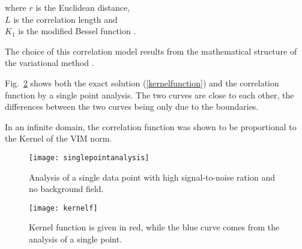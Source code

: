 where $r$ is the Euclidean distance,\\ 
\hphantom{where} $L$ is the correlation length and \\
\hphantom{where} $K_{1}$ is the modified Bessel function \citep[][page 359]{ABRAMOWITZ64}.

%
%
%
%
%
%
%

The choice of this correlation model results from the mathematical structure of the variational method \citep{BRASSEUR96}.

Fig.~\ref{kernel1} shows both the exact solution (\ref{kernelfunction}) and the correlation function by a single point analysis. The two curves are close to each other, the differences between the two curves being only due to the boundaries.

In an infinite domain, the correlation function was shown to be proportional to the Kernel of the VIM norm.

\begin{figure}[H]
\centering
\texttt{[image: singlepointanalysis]}
\caption{Analysis of a single data point with high signal-to-noise ration and no background field.\label{singleanalysis}}
\end{figure}

\begin{figure}[H]
\centering
\texttt{[image: kernelf]}
\caption{Kernel function is given in red, while the blue curve comes from the analysis of a single point.\label{kernel1}}
\end{figure}


